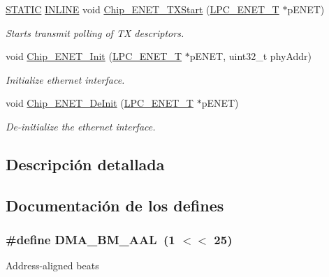 \begin{DoxyCompactItemize}
\hyperlink{group___l_p_c___types___public___macros_ga10b2d890d871e1489bb02b7e70d9bdfb}{S\+T\+A\+T\+IC} \hyperlink{spifi__18xx__43xx_8h_a2eb6f9e0395b47b8d5e3eeae4fe0c116}{I\+N\+L\+I\+NE} void \hyperlink{group___e_n_e_t__18_x_x__43_x_x_gadb075c919f1870edd00a1f86cc2504b3}{Chip\+\_\+\+E\+N\+E\+T\+\_\+\+T\+X\+Start} (\hyperlink{struct_l_p_c___e_n_e_t___t}{L\+P\+C\+\_\+\+E\+N\+E\+T\+\_\+T} $\ast$p\+E\+N\+ET)
\begin{DoxyCompactList}\small\item\em Starts transmit polling of TX descriptors. \end{DoxyCompactList}\item 
void \hyperlink{group___e_n_e_t__18_x_x__43_x_x_ga99d0be52bb0716f996ec379d0000a0ae}{Chip\+\_\+\+E\+N\+E\+T\+\_\+\+Init} (\hyperlink{struct_l_p_c___e_n_e_t___t}{L\+P\+C\+\_\+\+E\+N\+E\+T\+\_\+T} $\ast$p\+E\+N\+ET, uint32\+\_\+t phy\+Addr)
\begin{DoxyCompactList}\small\item\em Initialize ethernet interface. \end{DoxyCompactList}\item 
void \hyperlink{group___e_n_e_t__18_x_x__43_x_x_ga94eb7a70f4023c83ca18e4e675ad0b32}{Chip\+\_\+\+E\+N\+E\+T\+\_\+\+De\+Init} (\hyperlink{struct_l_p_c___e_n_e_t___t}{L\+P\+C\+\_\+\+E\+N\+E\+T\+\_\+T} $\ast$p\+E\+N\+ET)
\begin{DoxyCompactList}\small\item\em De-\/initialize the ethernet interface. \end{DoxyCompactList}\end{DoxyCompactItemize}


\subsection{Descripción detallada}


\subsection{Documentación de los \textquotesingle{}defines\textquotesingle{}}
\subsubsection[{\texorpdfstring{D\+M\+A\+\_\+\+B\+M\+\_\+\+A\+AL}{DMA_BM_AAL}}]{\setlength{\rightskip}{0pt plus 5cm}\#define D\+M\+A\+\_\+\+B\+M\+\_\+\+A\+AL~(1 $<$$<$ 25)}\hypertarget{group___e_n_e_t__18_x_x__43_x_x_gaf4e575958ecb11bb5fc3da230b8c16d3}{}\label{group___e_n_e_t__18_x_x__43_x_x_gaf4e575958ecb11bb5fc3da230b8c16d3}
Address-\/aligned beats 

